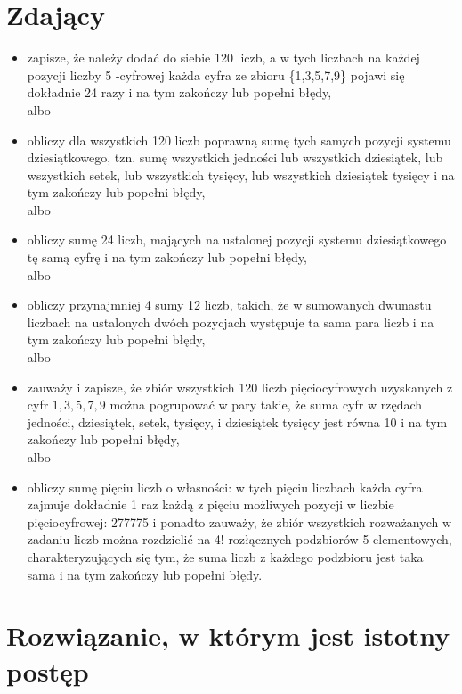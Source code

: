 \documentclass[10pt]{article}
\begin{document}
\section*{Zdający}
\begin{itemize}
  \item zapisze, że należy dodać do siebie 120 liczb, a w tych liczbach na każdej pozycji liczby 5 -cyfrowej każda cyfra ze zbioru \{1,3,5,7,9\} pojawi się dokładnie 24 razy i na tym zakończy lub popełni błędy,\\
albo
  \item obliczy dla wszystkich 120 liczb poprawną sumę tych samych pozycji systemu dziesiątkowego, tzn. sumę wszystkich jedności lub wszystkich dziesiątek, lub wszystkich setek, lub wszystkich tysięcy, lub wszystkich dziesiątek tysięcy i na tym zakończy lub popełni błędy,\\
albo
  \item obliczy sumę 24 liczb, mających na ustalonej pozycji systemu dziesiątkowego tę samą cyfrę i na tym zakończy lub popełni błędy,\\
albo
  \item obliczy przynajmniej 4 sumy 12 liczb, takich, że w sumowanych dwunastu liczbach na ustalonych dwóch pozycjach występuje ta sama para liczb i na tym zakończy lub popełni błędy,\\
albo
  \item zauważy i zapisze, że zbiór wszystkich 120 liczb pięciocyfrowych uzyskanych z cyfr $1,3,5,7,9$ można pogrupować w pary takie, że suma cyfr w rzędach jedności, dziesiątek, setek, tysięcy, i dziesiątek tysięcy jest równa 10 i na tym zakończy lub popełni błędy,\\
albo
  \item obliczy sumę pięciu liczb o własności: w tych pięciu liczbach każda cyfra zajmuje dokładnie 1 raz każdą z pięciu możliwych pozycji w liczbie pięciocyfrowej: 277775 i ponadto zauważy, że zbiór wszystkich rozważanych w zadaniu liczb można rozdzielić na 4! rozłącznych podzbiorów 5-elementowych, charakteryzujących się tym, że suma liczb z każdego podzbioru jest taka sama i na tym zakończy lub popełni błędy.
\end{itemize}

\section*{Rozwiązanie, w którym jest istotny postęp}
\end{document}
